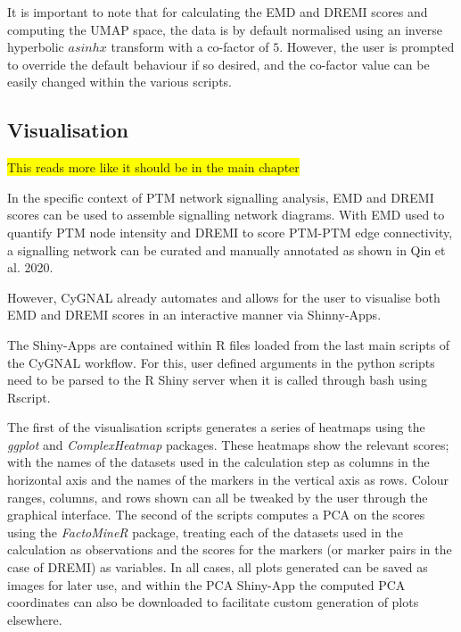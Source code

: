 It is important to note that for calculating the EMD and DREMI scores and computing the UMAP space, the data is by default normalised using an inverse hyperbolic \(asinh x\) transform with a co-factor of \(5\). However, the user is prompted to override the default behaviour if so desired, and the co-factor value can be easily changed within the various scripts.

\subsection{Visualisation}

\colorbox{yellow}{This reads more like it should be in the main chapter}

In the specific context of PTM network signalling analysis, EMD and DREMI scores can be used to assemble signalling network diagrams. With EMD used to quantify PTM node intensity and DREMI to score PTM-PTM edge connectivity, a signalling network can be curated and manually annotated as shown in Qin et al. 2020\cite{qin_cell-type-specific_2020}. 

However, CyGNAL already automates and allows for the user to visualise both EMD and DREMI scores in an interactive manner via Shinny-Apps\cite{noauthor_rstudioshiny_2021}. 

The Shiny-Apps are contained within R files loaded from the last main scripts of the CyGNAL workflow. For this, user defined arguments in the python scripts need to be parsed to the R Shiny server when it is called through bash using Rscript.

The first of the visualisation scripts generates a series of heatmaps using the \emph{ggplot}\cite{wickham_ggplot2_2009} and \emph{ComplexHeatmap}\cite{gu_complexheatmap_2021} packages. These heatmaps show the relevant scores; with the names of the datasets used in the calculation step as columns in the horizontal axis and the names of the markers in the vertical axis as rows. Colour ranges, columns, and rows shown can all be tweaked by the user through the graphical interface. 
The second of the scripts computes a PCA on the scores using the \emph{FactoMineR} package\cite{le_factominer_2008}, treating each of the datasets used in the calculation as observations and the scores for the markers (or marker pairs in the case of DREMI) as variables. In all cases, all plots generated can be saved as images for later use, and within the PCA Shiny-App the computed PCA coordinates can also be downloaded to facilitate custom generation of plots elsewhere.

